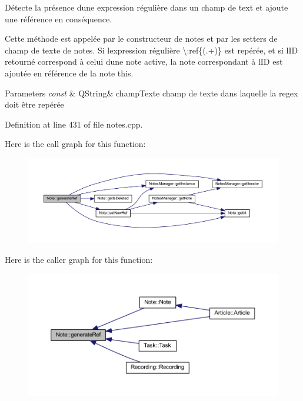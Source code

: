 Détecte la présence d\textquotesingle{}une expression régulière dans un champ de text et ajoute une référence en conséquence. 

Cette méthode est appelée par le constructeur de notes et par les setters de champ de texte de notes. Si l\textquotesingle{}expression régulière \textbackslash{}\+:ref\{(.+)\} est repérée, et si l\textquotesingle{}ID retourné correspond à celui d\textquotesingle{}une note active, la note correspondant à l\textquotesingle{}ID est ajoutée en référence de la note this. 
\begin{DoxyParams}{Parameters}
{\em const} & Q\+String\& champ\+Texte champ de texte dans laquelle la regex doit être repérée \\
\hline
\end{DoxyParams}


Definition at line 431 of file notes.\+cpp.

Here is the call graph for this function\+:\nopagebreak
\begin{figure}[H]
\begin{center}
\leavevmode
\includegraphics[width=350pt]{class_note_a5a0cb370ddd5a3da10fe8aa8a256d661_cgraph}
\end{center}
\end{figure}
Here is the caller graph for this function\+:\nopagebreak
\begin{figure}[H]
\begin{center}
\leavevmode
\includegraphics[width=350pt]{class_note_a5a0cb370ddd5a3da10fe8aa8a256d661_icgraph}
\end{center}
\end{figure}
\mbox{\label{class_note_a89b9be4eae802c78a0959aa9bd408e41}} 
